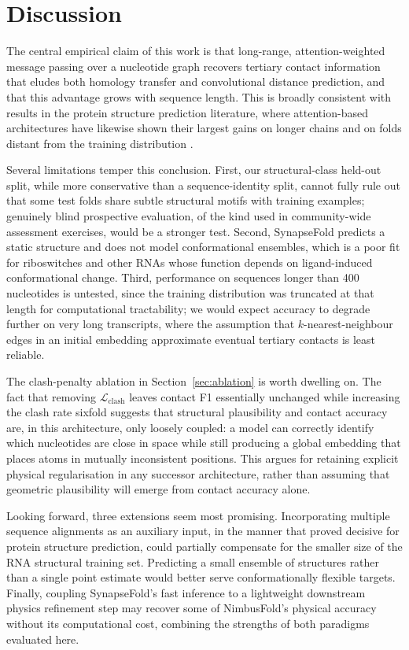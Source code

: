 \section{Discussion}
\label{sec:discussion}

The central empirical claim of this work is that long-range, attention-weighted message passing over a nucleotide graph recovers tertiary contact information that eludes both homology transfer and convolutional distance prediction, and that this advantage grows with sequence length. This is broadly consistent with results in the protein structure prediction literature, where attention-based architectures have likewise shown their largest gains on longer chains and on folds distant from the training distribution \citep{silva2020transformer,anand2022sequence}.

Several limitations temper this conclusion. First, our structural-class held-out split, while more conservative than a sequence-identity split, cannot fully rule out that some test folds share subtle structural motifs with training examples; genuinely blind prospective evaluation, of the kind used in community-wide assessment exercises, would be a stronger test. Second, SynapseFold predicts a static structure and does not model conformational ensembles, which is a poor fit for riboswitches and other RNAs whose function depends on ligand-induced conformational change. Third, performance on sequences longer than 400 nucleotides is untested, since the training distribution was truncated at that length for computational tractability; we would expect accuracy to degrade further on very long transcripts, where the assumption that $k$-nearest-neighbour edges in an initial embedding approximate eventual tertiary contacts is least reliable.

The clash-penalty ablation in Section~\ref{sec:ablation} is worth dwelling on. The fact that removing $\mathcal{L}_{\mathrm{clash}}$ leaves contact F1 essentially unchanged while increasing the clash rate sixfold suggests that structural plausibility and contact accuracy are, in this architecture, only loosely coupled: a model can correctly identify which nucleotides are close in space while still producing a global embedding that places atoms in mutually inconsistent positions. This argues for retaining explicit physical regularisation in any successor architecture, rather than assuming that geometric plausibility will emerge from contact accuracy alone.

Looking forward, three extensions seem most promising. Incorporating multiple sequence alignments as an auxiliary input, in the manner that proved decisive for protein structure prediction, could partially compensate for the smaller size of the RNA structural training set. Predicting a small ensemble of structures rather than a single point estimate would better serve conformationally flexible targets. Finally, coupling SynapseFold's fast inference to a lightweight downstream physics refinement step may recover some of NimbusFold's physical accuracy without its computational cost, combining the strengths of both paradigms evaluated here.
